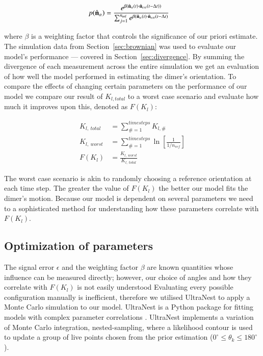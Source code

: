 \documentclass[final, 3p]{elsarticle}
\begin{document}
\begin{align}
  p(\hat{\bf n}_\alpha)
  &=\frac{e^{\beta (\hat{\bf n}_\alpha (t) 
  	\cdot \hat{\bf n}_{est}(t-\Delta t))}}
  {\sum_{j=1}^{n_{\rm ref}}
	e^{\beta (\hat{\bf n}_\alpha (t) 
	\cdot \hat{\bf n}_{est}(t-\Delta t)}}
\end{align}

where $\beta$ is a weighting factor that controls the significance of our priori estimate. The simulation data from Section~\ref{sec:brownian} was used to evaluate our model's performance --- covered in Section~\ref{sec:divergence}. By summing the divergence of each measurement across the entire simulation we get an evaluation of how well the model performed in estimating the dimer's orientation. To compare the effects of changing certain parameters on the performance of our model we compare our result of $K_{l,total}$ to a worst case scenario and evaluate how much it improves upon this, denoted as $F(K_l)$:

\begin{align}
K_{l, \ total} &= \sum\limits_{\# =1}^{timesteps} K_{l,\#} \\
K_{l, \ worst} &= \sum\limits_{\#=1}^{timesteps} \ln \left[\frac{1}{1/n_{ref}} \right] \\
F(K_l) &= \frac{K_{l,\ worst}}{K_{l, \ total}}
\end{align}

The worst case scenario is akin to randomly choosing a reference orientation at each time step. The greater the value of $F(K_l)$ the better our model fits the dimer's motion. Because our model is dependent on several parameters we need to a sophisticated method for understanding how these parameters correlate with $F(K_l)$.


\subsection{Optimization of parameters}
\label{sec:ultranest}

The signal error $\epsilon$ and the weighting factor $\beta$ are known quantities whose influence can be measured directly; however, our choice of angles and how they correlate with $F(K_l)$ is not easily understood Evaluating every possible configuration manually is inefficient, therefore we utilised UltraNest to apply a Monte Carlo simulation to our model. UltraNest is a Python package for fitting models with complex parameter correlations \cite{Buchner2016Ultranest}. UltraNest implements a variation of Monte Carlo integration, nested-sampling, where a likelihood contour is used to update a group of live points chosen from the prior estimation ($0^{\circ} \leq \theta_k \leq 180^{\circ}$).
\end{document}
